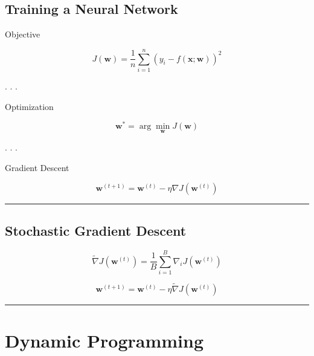 \documentclass[
  letterpaper,
  DIV=11,
  numbers=noendperiod]{scrartcl}
\begin{document}
\hypertarget{training-a-neural-network}{%
\subsection{Training a Neural Network}\label{training-a-neural-network}}

Objective

\[\begin{equation}
J(\mathbf{w}) = \frac{1}{n} \sum_{i=1}^n (y_i - f(\mathbf{x}; \mathbf{w}))^2
\end{equation}\]

. . .

Optimization

\[\begin{equation}
\mathbf{w}^* = \arg \min_{\mathbf{w}} J(\mathbf{w})
\end{equation}\]

. . .

Gradient Descent

\[\begin{equation}
\mathbf{w}^{(t+1)} = \mathbf{w}^{(t)} - \eta \nabla J(\mathbf{w}^{(t)})
\end{equation}\]

\begin{center}\rule{0.5\linewidth}{0.5pt}\end{center}

\hypertarget{stochastic-gradient-descent}{%
\subsection{Stochastic Gradient
Descent}\label{stochastic-gradient-descent}}

\[\begin{equation}
\widetilde{\nabla} J(\mathbf{w}^{(t)}) = \frac{1}{B} \sum_{i=1}^B \nabla_i J(\mathbf{w}^{(t)})
\end{equation}\]

\[\begin{equation}
\mathbf{w}^{(t+1)} = \mathbf{w}^{(t)} - \eta \widetilde{\nabla} J(\mathbf{w}^{(t)})
\end{equation}\]

\begin{center}\rule{0.5\linewidth}{0.5pt}\end{center}

\hypertarget{dynamic-programming}{%
\section{Dynamic Programming}\label{dynamic-programming}}
\end{document}
